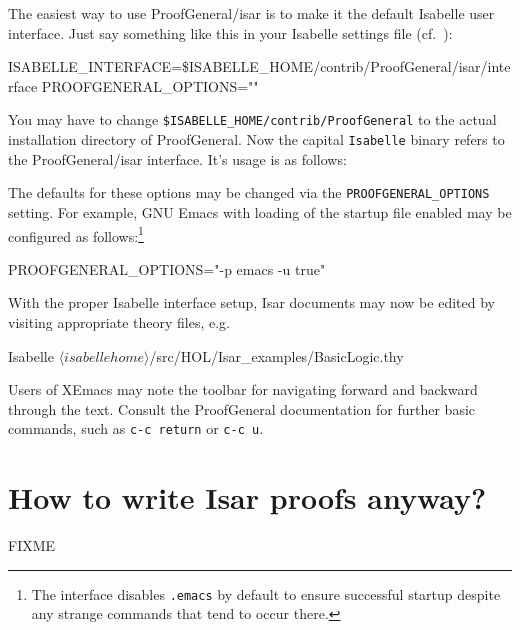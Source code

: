 The easiest way to use ProofGeneral/isar is to make it the default Isabelle
user interface.  Just say something like this in your Isabelle settings file
(cf.\ \cite{isabelle-sys}):
\begin{ttbox}
ISABELLE_INTERFACE=\$ISABELLE_HOME/contrib/ProofGeneral/isar/interface
PROOFGENERAL_OPTIONS=""
\end{ttbox}
You may have to change \texttt{\$ISABELLE_HOME/contrib/ProofGeneral} to the
actual installation directory of ProofGeneral.  Now the capital
\texttt{Isabelle} binary refers to the ProofGeneral/isar interface.  It's
usage is as follows:
The defaults for these options may be changed via the
\texttt{PROOFGENERAL_OPTIONS} setting.  For example, GNU Emacs with loading of
the startup file enabled may be configured as follows:\footnote{The interface
  disables \texttt{.emacs} by default to ensure successful startup despite any
  strange commands that tend to occur there.}
\begin{ttbox}
PROOFGENERAL_OPTIONS="-p emacs -u true"
\end{ttbox}

With the proper Isabelle interface setup, Isar documents may now be edited by
visiting appropriate theory files, e.g.\ 
\begin{ttbox}
Isabelle \({\langle}isabellehome{\rangle}\)/src/HOL/Isar_examples/BasicLogic.thy
\end{ttbox}
Users of XEmacs may note the toolbar for navigating forward and backward
through the text.  Consult the ProofGeneral documentation for further basic
commands, such as \texttt{c-c return} or \texttt{c-c u}.


\section{How to write Isar proofs anyway?}

FIXME


